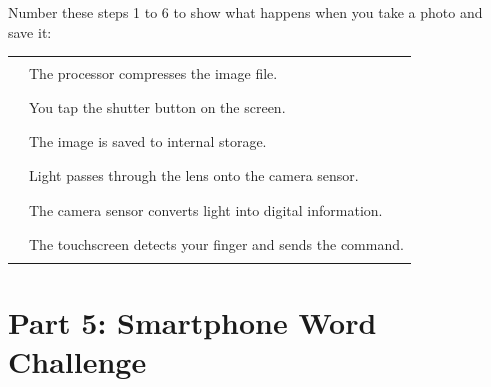 \begin{tcolorbox}[enhanced,colback=SoftPurple!8,colframe=SoftPurple,arc=6pt,boxrule=1pt,
  left=10pt,right=10pt,top=8pt,bottom=8pt]

Number these steps 1 to 6 to show what happens when you take a photo and save it:

\begin{center}
\begin{tabular}{cl}
\rule{1cm}{0.4pt} & The processor compresses the image file. \\[6pt]
\rule{1cm}{0.4pt} & You tap the shutter button on the screen. \\[6pt]
\rule{1cm}{0.4pt} & The image is saved to internal storage. \\[6pt]
\rule{1cm}{0.4pt} & Light passes through the lens onto the camera sensor. \\[6pt]
\rule{1cm}{0.4pt} & The camera sensor converts light into digital information. \\[6pt]
\rule{1cm}{0.4pt} & The touchscreen detects your finger and sends the command. \\[6pt]
\end{tabular}
\end{center}
\end{tcolorbox}

\vspace{12pt}

\section*{Part 5: Smartphone Word Challenge}

